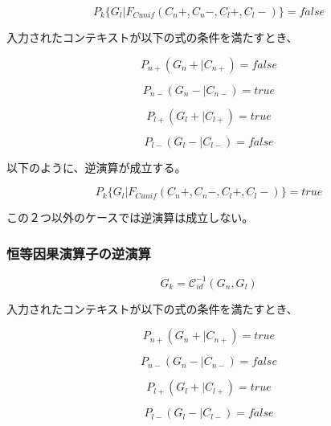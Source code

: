 \documentclass[12pt]{article}
\begin{document}
\begin{equation} P_k\{G_l|F_{Cunif}(C_n+,C_n-,C_l+,C_l-)\}=false\end{equation}

入力されたコンテキストが以下の式の条件を満たすとき、

\begin{equation} P_{n+}(G_n+|C_{n+})=false\end{equation}

\begin{equation} P_{n-}(G_n-|C_{n-})=true\end{equation}

\begin{equation} P_{l+}(G_l+|C_{l+})=true \end{equation}

\begin{equation} P_{l-}(G_l-|C_{l-}) = false \end{equation}

以下のように、逆演算が成立する。

\begin{equation} P_k\{G_l|F_{Cunif}(C_n+,C_n-,C_l+,C_l-)\}=true\end{equation}

この２つ以外のケースでは逆演算は成立しない。

\subsubsection{恒等因果演算子の逆演算}\label{ux6052ux7b49ux56e0ux679cux6f14ux7b97ux5b50ux306eux9006ux6f14ux7b97}

\begin{equation} G_k = \mathcal{C}_{id}^{-1}(G_n,G_l)\end{equation}

入力されたコンテキストが以下の式の条件を満たすとき、

\begin{equation} P_{n+}(G_n+|C_{n+})=true\end{equation}

\begin{equation} P_{n-}(G_n-|C_{n-})=false\end{equation}

\begin{equation} P_{l+}(G_l+|C_{l+})=true \end{equation}

\begin{equation} P_{l-}(G_l-|C_{l-}) = false \end{equation}
\end{document}
